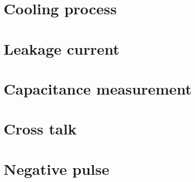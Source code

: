 
\section{Cooling process}
\label{sec:ii:cool}

\section{Leakage current}
\label{sec:ii:current}

\section{Capacitance measurement}
\label{sec:ii:c}

\section{Cross talk}
\label{sec:ii:xtalk}

\section{Negative pulse}
\label{sec:ii:npulse}




